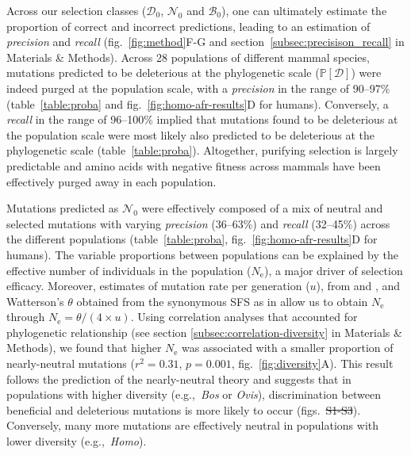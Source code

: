 \documentclass{article}
\newcommand{\Ne}{N_{\text{e}}}
\newcommand{\proba}{\mathbb{P}}
\newcommand{\SphyDel}{\mathcal{D}_0}
\newcommand{\SphyNeu}{\mathcal{N}_0}
\newcommand{\SphyBen}{\mathcal{B}_0}
\newcommand{\SpopDel}{\mathcal{D}}
\newcommand{\ProbaPopDel}{\proba [ \SpopDel]}
\providecommand{\DIFaddtex}[1]{{\protect\color{blue}\uwave{#1}}} %
\providecommand{\DIFdeltex}[1]{{\protect\color{red}\sout{#1}}}                      %
\providecommand{\DIFaddbegin}{} %
\providecommand{\DIFaddend}{} %
\providecommand{\DIFdelbegin}{} %
\providecommand{\DIFdelend}{} %
\providecommand{\DIFadd}[1]{\texorpdfstring{\DIFaddtex{#1}}{#1}} %
\providecommand{\DIFdel}[1]{\texorpdfstring{\DIFdeltex{#1}}{}} %
\newcommand{\DIFscaledelfig}{0.5}
\newlength{\DIFdelgraphicswidth} %
\newlength{\DIFdelgraphicsheight} %
\newcommand{\DIFaddincludegraphics}[2][]{{\color{blue}\fbox{\DIFOincludegraphics[#1]{#2}}}} %
\newcommand{\DIFdelincludegraphics}[2][]{%
\sbox{\DIFdelgraphicsbox}{\DIFOincludegraphics[#1]{#2}}%
\settoboxwidth{\DIFdelgraphicswidth}{\DIFdelgraphicsbox} %
\settoboxtotalheight{\DIFdelgraphicsheight}{\DIFdelgraphicsbox} %
\scalebox{\DIFscaledelfig}{%
\parbox[b]{\DIFdelgraphicswidth}{\usebox{\DIFdelgraphicsbox}\\[-\baselineskip] \rule{\DIFdelgraphicswidth}{0em}}\llap{\resizebox{\DIFdelgraphicswidth}{\DIFdelgraphicsheight}{%
\setlength{\unitlength}{\DIFdelgraphicswidth}%
\begin{picture}(1,1)%
\thicklines\linethickness{2pt} %
{\color[rgb]{1,0,0}\put(0,0){\framebox(1,1){}}}%
{\color[rgb]{1,0,0}\put(0,0){\line( 1,1){1}}}%
{\color[rgb]{1,0,0}\put(0,1){\line(1,-1){1}}}%
\end{picture}%
}\hspace*{3pt}}} %
} %
\DeclareRobustCommand{\DIFaddbegin}{\DIFOaddbegin \let\includegraphics\DIFaddincludegraphics} %
\DeclareRobustCommand{\DIFaddend}{\DIFOaddend \let\includegraphics\DIFOincludegraphics} %
\DeclareRobustCommand{\DIFdelbegin}{\DIFOdelbegin \let\includegraphics\DIFdelincludegraphics} %
\DeclareRobustCommand{\DIFdelend}{\DIFOaddend \let\includegraphics\DIFOincludegraphics} %
\begin{document}
    Across our selection classes ($\SphyDel$, $\SphyNeu$ and $\SphyBen$), one can ultimately estimate the proportion of correct and incorrect predictions, leading to an estimation of \textit{precision} and \textit{recall} (fig.~\ref{fig:method}F-G and section~\ref{subsec:precisison_recall} in Materials \& Methods).
    Across 28 populations of different mammal species, mutations predicted to be deleterious at the phylogenetic scale ($\ProbaPopDel$) were indeed purged at the population scale, with a \textit{precision} in the range of 90--97\% (table~\ref{table:proba} and fig.~\ref{fig:homo-afr-results}D for humans).
    Conversely, a \textit{recall} in the range of 96--100\% implied that mutations found to be deleterious at the population scale were most likely also predicted to be deleterious at the phylogenetic scale (table~\ref{table:proba}).
    Altogether, purifying selection is largely predictable and amino acids with negative fitness across mammals have been effectively purged away in each population.

    Mutations predicted as $\SphyNeu$ were effectively composed of a mix of neutral and selected mutations with varying \textit{precision} (36--63\%) and \textit{recall} (32--45\%) across the different populations (table~\ref{table:proba}, fig.~\ref{fig:homo-afr-results}D for humans).
    The variable proportions between populations can be explained by the effective number of individuals in the population ($\Ne$), a major driver of selection efficacy.
    Moreover, estimates of mutation rate per generation ($u$), from \textcite{bergeron_evolution_2023} and \textcite{orlando_recalibrating_2013}, and Watterson’s $\theta$ obtained from the synonymous SFS as in \textcite{achaz_frequency_2009}\DIFaddbegin \DIFadd{, }\DIFaddend allow us to obtain $\Ne$ through \DIFdelbegin \DIFdel{$\Ne=\theta/(4 \times u)$}\DIFdelend \DIFaddbegin \DIFadd{$\Ne=\theta/4 u)$}\DIFaddend .
    Using correlation analyses that accounted for phylogenetic relationship (see section \ref{subsec:correlation-diversity} in Materials \& Methods), we found that higher $\Ne$ was associated with a smaller proportion of nearly-neutral mutations ($r^2=0.31$, $p=0.001$, fig.~\ref{fig:diversity}A).
    This result follows the prediction of the nearly-neutral theory and suggests that in populations with higher diversity (e.g.,~\textit{Bos} or \textit{Ovis}), discrimination between beneficial and deleterious mutations is more likely to occur (figs.~\DIFdelbegin \DIFdel{S1-S3}\DIFdelend \DIFaddbegin \DIFadd{S3-S5}\DIFaddend ).
    Conversely, many more mutations are effectively neutral in populations with lower diversity (e.g.,~\textit{Homo}).
\end{document}
